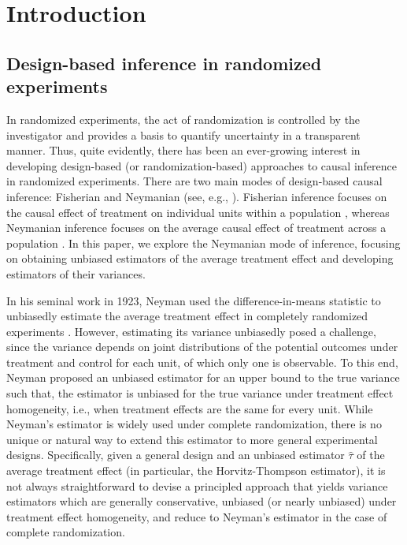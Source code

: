 \documentclass[12pt]{article}
\begin{document}
\section{Introduction}
\label{sec_intro}

\subsection{Design-based inference in randomized experiments}
\label{sec_designbased}

In randomized experiments, the act of randomization is controlled by the investigator and provides a basis to quantify uncertainty in a transparent manner. Thus, quite evidently, there has been an ever-growing interest in developing design-based (or randomization-based) approaches to causal inference in randomized experiments. 
There are two main modes of design-based causal inference: Fisherian and Neymanian (see, e.g., \cite{dasgupta2015causal,ding2017paradox}). Fisherian inference focuses on the causal effect of treatment on individual units within a population \cite{fisher1935design}, whereas Neymanian inference focuses on the average causal effect of treatment across a population \cite{neyman1923application}. In this paper, we explore the Neymanian mode of inference, focusing on obtaining unbiased estimators of the average treatment effect and developing estimators of their variances.

In his seminal work in 1923, Neyman
used the difference-in-means statistic to unbiasedly estimate the average treatment effect in completely randomized experiments \cite{neyman1923application}.
However, estimating its variance unbiasedly posed a challenge, since the variance depends on joint distributions of the potential outcomes under treatment and control for each unit, of which only one is observable.
To this end, Neyman proposed an unbiased estimator for an upper bound to the true variance such that, the estimator is unbiased for the true variance under treatment effect homogeneity, i.e., when treatment effects are the same for every unit. 
While Neyman's estimator is widely used under complete randomization, there is no unique or natural way to extend this estimator to more general experimental designs.
Specifically, given a general design and an unbiased estimator $\hat{\tau}$ of the average treatment effect (in particular, the Horvitz-Thompson estimator), it is not always straightforward to devise a principled approach that yields variance estimators which are generally conservative, unbiased (or nearly unbiased) under treatment effect homogeneity, and reduce to Neyman’s estimator in the case of complete randomization.
\end{document}
